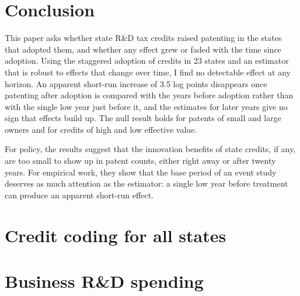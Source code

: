 \documentclass[12pt]{article}
\begin{document}
\section{Conclusion}\label{sec:conclusion}

This paper asks whether state R\&D tax credits raised patenting in the states that adopted them, and whether
any effect grew or faded with the time since adoption. Using the staggered adoption of credits in 23 states and
an estimator that is robust to effects that change over time, I find no detectable effect at any horizon.
An apparent short-run increase of 3.5 log points disappears once patenting after adoption is compared with the
years before adoption rather than with the single low year just before it, and the estimates for later years give
no sign that effects build up. The null result holds for patents of small and large owners and for credits of
high and low effective value.

For policy, the results suggest that the innovation benefits of state credits, if any, are too small to show up in
patent counts, either right away or after twenty years. For empirical work, they show that the base period of an
event study deserves as much attention as the estimator: a single low year before treatment can produce an
apparent short-run effect.

\newpage



\newpage
\appendix
\setcounter{table}{0}
\setcounter{figure}{0}
\renewcommand{\thetable}{A\arabic{table}}
\renewcommand{\thefigure}{A\arabic{figure}}
\section{Credit coding for all states}\label{app:policy}

{\footnotesize
\setlength{\tabcolsep}{3pt}

}

\section{Business R\&D spending}\label{app:rd}
\end{document}
